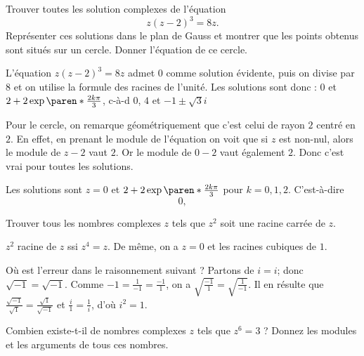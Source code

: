 \documentclass[12pt,french,oneside,a4paper]{memoir} %
\begin{document}
\begin{exo}
Trouver toutes les solution complexes de l'équation
\begin{equation*}
z(z-2)^3=8z.
\end{equation*}
Représenter ces solutions dans le plan de Gauss et montrer que les points 
obtenus sont situés sur un cercle. Donner l'équation de ce cercle. 

\begin{correction}
  L'équation $z(z-2)^3=8z$ admet 0 comme solution évidente, puis on divise par 8 et on utilise la formule des racines de l'unité. Les solutions sont donc : $0$ et $2 + 2 \exp{\paren*{\frac{2k\pi}{3}}}$, c-à-d $0$, $4$ et $-1 \pm \sqrt 3 i$

  Pour le cercle, on remarque géométriquement que c'est celui de rayon $2$ centré en $2$. En effet, en prenant le module de l'équation on voit que si $z$ est non-nul, alors le module de $z-2$ vaut $2$. Or le module de $0-2$ vaut également $2$. Donc c'est vrai pour toutes les solutions.

  Les solutions sont $z = 0$ et $2 + 2 \exp{\paren*{\frac{2k\pi}{3}}}$ pour $k = 0,1,2$. C'est-à-dire
  \begin{equation*}
    0, 
  \end{equation*}
\end{correction}
\end{exo}

\begin{exo}
Trouver tous les nombres complexes $z$ tels que $z^2$ soit une 
racine carrée de $z$. 
\begin{correction}
  $z^2$ racine de $z$ ssi $z^4 = z$. De même, on a $z = 0$ et les racines cubiques
de $1$.
\end{correction}
\end{exo}

\begin{exo}
Où est l'erreur dans le raisonnement suivant ? Partons de 
$i=i$; donc $\sqrt{-1} = \sqrt{-1}$. Comme $-1= \displaystyle{\frac{1}{-1} = 
\frac{-1}{1}}$, on a $\displaystyle{\sqrt{\frac{-1}{1}} = \sqrt{\frac{1}{-1}}}$. 
Il en résulte que $\displaystyle{\frac{\sqrt{-1}}{\sqrt{1}} = 
\frac{\sqrt{1}}{\sqrt{-1}}}$ et $\displaystyle{\frac{i}{1} = \frac{1}{i}}$, 
d'où $i^2=1$.
\end{exo}

\begin{exo}
Combien existe-t-il de nombres complexes $z$ tels que $z^6=3$ ? 
Donnez les modules et les arguments de tous ces nombres.
\end{exo}
\end{document}

